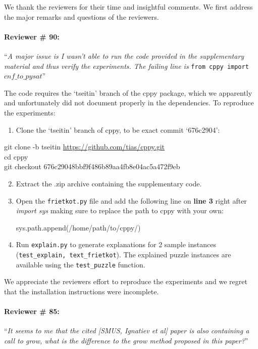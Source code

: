 \documentclass{article}
\begin{document}
We thank the reviewers for their time and insightful comments. We first address the major remarks and questions of the reviewers.

\paragraph{Reviewer \# 90:} ``\textit{A major issue is I wasn't able to run the code provided in the supplementary material and thus verify the experiments. The failing line is} \texttt{from cppy import $cnf\_to\_pysat$}''

The code requires the `tseitin' branch of the cppy package, which we apparently and unfortunately did not document properly in the dependencies. To reproduce the experiments:
\begin{enumerate}
	\item Clone the `tseitin' branch of cppy, to be exact commit `676c2904':
\end{enumerate}
{\footnotesize git clone -b tseitin \url{https://github.com/tias/cppy.git}}\\
{\footnotesize cd cppy} \\
{\footnotesize {git checkout 676c29048bbf9f486b89aa4fb8e04ac5a472f9eb}} 
\begin{enumerate}
	\setcounter{enumi}{1}
	\item Extract the .zip archive containing the supplementary code.
	\item Open the \texttt{frietkot.py} file and add the following line on \textbf{line 3} right after \emph{import sys} making sure to replace the path to cppy with your own:
	\begin{center}
	{ sys.path.append(\textquotesingle/home/path/to/cppy/\textquotesingle)}	
	\end{center}
	\item Run \texttt{explain.py} to generate explanations for 2 sample instances (\texttt{test\_explain, text\_frietkot}). The explained puzzle instances are available using the \texttt{test\_puzzle} function.
\end{enumerate}
We appreciate the reviewers effort to reproduce the experiments and we regret that the installation instructions were incomplete.


\paragraph{Reviewer \# 85:}``\textit{It seems to me that the cited [SMUS, Ignatiev et al] paper is also containing a call to grow, what is the difference to the grow method proposed in this paper?}''
\end{document}
